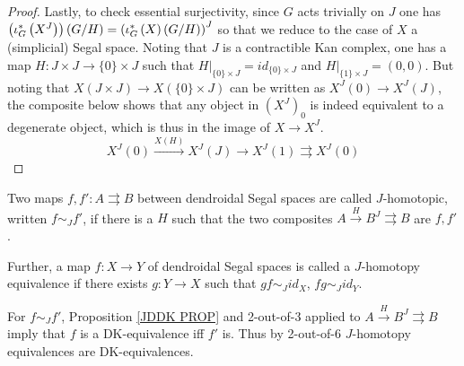 \documentclass[a4paper,10pt
,draft
]{article}%
\begin{document}
\begin{proof}
Lastly, to check essential surjectivity, 
since $G$ acts trivially on $J$ one has
$\left(\iota_G^{\**}\left( X^J \right)\right)(G/H)=
\left(\iota_G^{\**}\left( X \right)(G/H)\right)^J$
so that we reduce to the case of $X$ a (simplicial) Segal space.
Noting that $J$ is a contractible Kan complex,
one has a map 
$H \colon J \times J \to \{0\} \times J$
such that 
$H|_{\{0\}\times J} = id_{\{0\} \times J}$
and
$H|_{\{1\}\times J} = (0,0)$.
But noting that 
$X(J \times J) \to X(\{0\} \times J)$
can be written as 
$X^J(0) \to X^J(J)$, the composite below
shows that any object in $\left(X^J\right)_0$ is indeed equivalent to a 
degenerate object, which is thus in the image of $X\to X^J$.
\[
	X^J(0) \xrightarrow{X(H)} 
	X^{J}(J) \to
	X^J(1) \rightrightarrows X^J(0)
\]
%
\end{proof}


\begin{definition}
	Two maps $f,f'\colon A \rightrightarrows B$ between dendroidal Segal spaces are called $J$-homotopic, written $f \sim_J f'$, if
	there is a $H$ such that
	the two composites
	$A \xrightarrow{H} B^J \rightrightarrows B$
	are $f,f'$.
	
	Further, a map $f\colon X \to Y$ of dendroidal Segal spaces is called a $J$-homotopy equivalence if there exists $g \colon Y \to X$
	such that $gf \sim_J id_X$, $fg \sim_J id_Y$.
\end{definition}

\begin{remark}
	For $f\sim_J f'$, Proposition \ref{JDDK PROP} and 2-out-of-3 applied to $A \xrightarrow{H} B^J \rightrightarrows B$ imply that $f$ is a DK-equivalence iff $f'$ is.
	Thus by 2-out-of-6 $J$-homotopy equivalences are DK-equivalences.
\end{remark}
\end{document}
